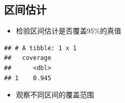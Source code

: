 \documentclass[]{book}
\newenvironment{Shaded}{\begin{snugshade}}{\end{snugshade}}
\newcommand{\DataTypeTok}[1]{\textcolor[rgb]{0.13,0.29,0.53}{#1}}
\newcommand{\KeywordTok}[1]{\textcolor[rgb]{0.13,0.29,0.53}{\textbf{#1}}}
\newcommand{\NormalTok}[1]{#1}
\newcommand{\OperatorTok}[1]{\textcolor[rgb]{0.81,0.36,0.00}{\textbf{#1}}}
\newcommand{\StringTok}[1]{\textcolor[rgb]{0.31,0.60,0.02}{#1}}
\providecommand{\tightlist}{%
  \setlength{\itemsep}{0pt}\setlength{\parskip}{0pt}}
\begin{document}
\hypertarget{ux533aux95f4ux4f30ux8ba1}{%
\subsection{区间估计}\label{ux533aux95f4ux4f30ux8ba1}}

\begin{itemize}
\tightlist
\item
  检验区间估计是否覆盖95\%的真值
\end{itemize}

\begin{Shaded}
\end{Shaded}

\begin{verbatim}
## # A tibble: 1 x 1
##   coverage
##      <dbl>
## 1    0.945
\end{verbatim}

\begin{itemize}
\tightlist
\item
  观察不同区间的覆盖范围
\end{itemize}
\end{document}
